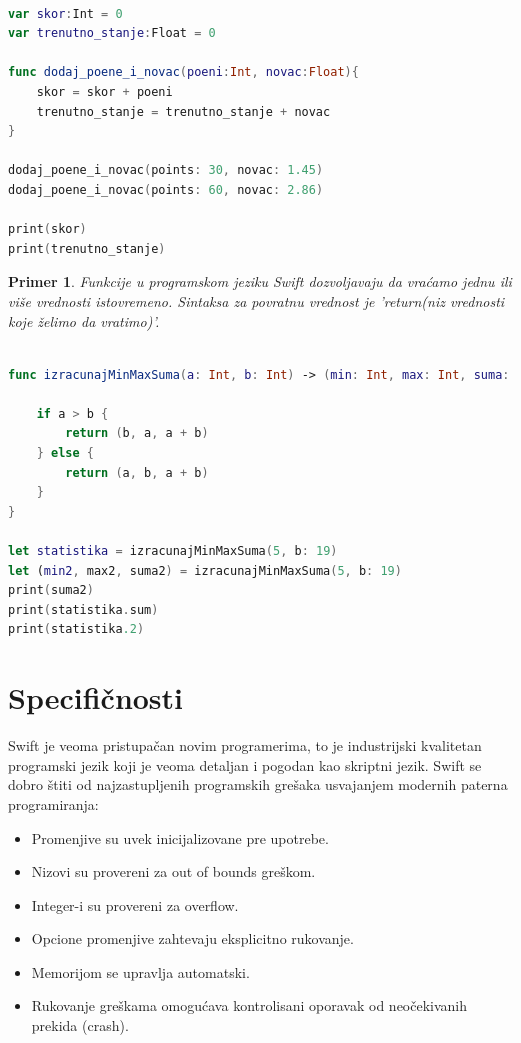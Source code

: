 \documentclass[a4paper]{article}
\newtheorem{primer}{Primer}[section]
\begin{document}
\begin{lstlisting}[language=Swift, caption={Funkcije bez povratne vrednosti},frame=single, label=simple]

var skor:Int = 0
var trenutno_stanje:Float = 0

func dodaj_poene_i_novac(poeni:Int, novac:Float){
	skor = skor + poeni
	trenutno_stanje = trenutno_stanje + novac
}

dodaj_poene_i_novac(points: 30, novac: 1.45)
dodaj_poene_i_novac(points: 60, novac: 2.86)

print(skor)
print(trenutno_stanje)

\end{lstlisting}

\begin{primer}
Funkcije u programskom jeziku Swift dozvoljavaju da vraćamo jednu ili više vrednosti istovremeno. Sintaksa za povratnu vrednost je 'return(niz vrednosti koje želimo da vratimo)'.
\end{primer}

\begin{lstlisting}[language=Swift, caption={Funkcije koje imaju povratnu vrednost},frame=single, label=simple]

func izracunajMinMaxSuma(a: Int, b: Int) -> (min: Int, max: Int, suma: Int) {
    
    if a > b {
        return (b, a, a + b)
    } else {
        return (a, b, a + b)
    }
}
 
let statistika = izracunajMinMaxSuma(5, b: 19)
let (min2, max2, suma2) = izracunajMinMaxSuma(5, b: 19)
print(suma2)            
print(statistika.sum)   
print(statistika.2)     

\end{lstlisting}


\section{Specifičnosti}	
\label{sec:sedmiDeo}

Swift je veoma pristupačan novim programerima, to je industrijski kvalitetan programski jezik koji je veoma detaljan i pogodan kao skriptni jezik. Swift se dobro štiti od najzastupljenih programskih grešaka usvajanjem modernih paterna programiranja:
\begin{itemize}
\item Promenjive su uvek inicijalizovane pre upotrebe.
\item Nizovi su provereni za out of bounds greškom.
\item Integer-i su provereni za overflow.
\item Opcione promenjive zahtevaju eksplicitno rukovanje.
\item Memorijom se upravlja automatski.
\item Rukovanje greškama omogućava kontrolisani oporavak od neočekivanih prekida (crash).
\end{itemize}
\end{document}
